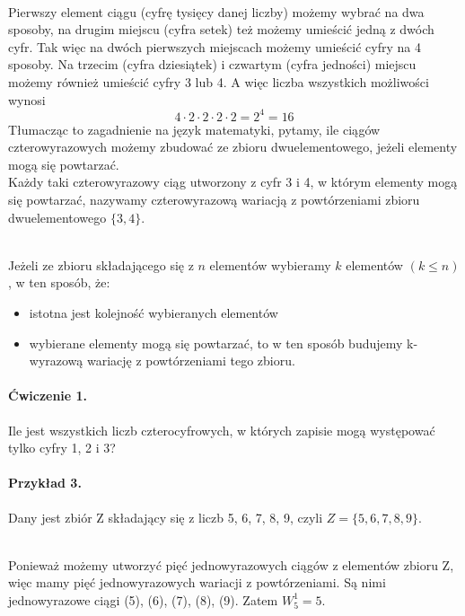 \documentclass[polish,10pt]{article}
\begin{document}
\hspace{1cm}\\Pierwszy element ciągu (cyfrę tysięcy danej liczby) możemy wybrać na dwa sposoby, na drugim miejscu (cyfra setek) też możemy umieścić jedną z dwóch cyfr. Tak więc na dwóch pierwszych miejscach możemy umieścić cyfry na 4 sposoby. Na trzecim (cyfra dziesiątek) i czwartym (cyfra jedności) miejscu możemy również umieścić cyfry 3 lub 4. A więc liczba wszystkich możliwości wynosi
\begin{equation*}
4\cdot2\cdot2\cdot2\cdot2=2^4=16
\end{equation*}
Tłumacząc to zagadnienie na język matematyki, pytamy, ile ciągów czterowyrazowych możemy zbudować ze zbioru dwuelementowego, jeżeli elementy mogą się powtarzać.\cite{ME}
\\Każdy taki czterowyrazowy ciąg utworzony z cyfr 3 i 4, w którym elementy
mogą się powtarzać, nazywamy czterowyrazową wariacją z powtórzeniami
zbioru dwuelementowego $\{3,4\}$.

\noindent{}

\hspace{1cm}\\Jeżeli ze zbioru składającego się z $n$ elementów wybieramy $k$ elementów $(k \leq n)$, w ten sposób, że:

\begin{itemize}
\item istotna jest kolejność wybieranych elementów
\item wybierane elementy mogą się powtarzać, to w ten sposób budujemy k-wyrazową wariację z powtórzeniami tego zbioru.
\end{itemize}
\paragraph{Ćwiczenie 1.}
Ile jest wszystkich liczb czterocyfrowych, w których zapisie mogą występować tylko cyfry 1, 2 i 3?
\paragraph{Przykład 3.}
Dany jest zbiór Z składający się z liczb 5, 6, 7, 8, 9, 
czyli $Z=\{5, 6, 7, 8, 9\}$.

\hspace{1cm}\\Ponieważ możemy utworzyć pięć jednowyrazowych ciągów z elementów zbioru Z, więc
mamy pięć jednowyrazowych wariacji z powtórzeniami. Są nimi jednowyrazowe ciągi (5), (6), (7), (8), (9). Zatem $W^1_5 = 5$.
\end{document}
